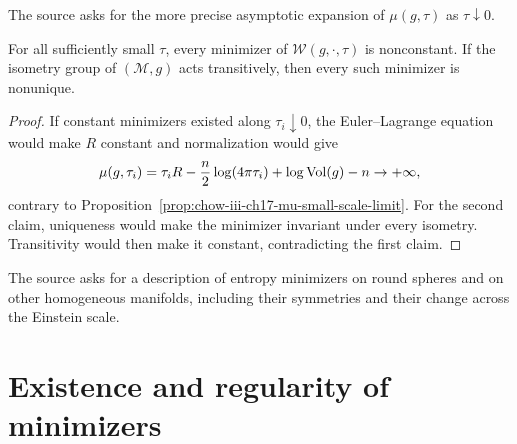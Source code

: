 \begin{remark}
\label{rem:chow-iii-ch17-mu-small-scale-asymptotics-problem}

The source asks for the more precise asymptotic expansion of $\mu(g,\tau)$
as $\tau\downarrow0$.
\end{remark}

\begin{lemma}
\label{lem:chow-iii-ch17-small-minimizer-nonconstant-nonunique}


For all sufficiently small $\tau$, every minimizer of
$\mathcal W(g,\cdot,\tau)$ is nonconstant.  If the isometry group of
$(\mathcal M,g)$ acts transitively, then every such minimizer is nonunique.
\end{lemma}
\begin{proof}
\sketch If constant minimizers existed along $\tau_i\downarrow0$, the
Euler--Lagrange equation would make $R$ constant and normalization would give
\[
 \mu(g,\tau_i)=\tau_iR-\frac n2\log(4\pi\tau_i)+\log\operatorname{Vol}(g)-n\to+\infty,
\]
contrary to Proposition~\ref{prop:chow-iii-ch17-mu-small-scale-limit}.
For the second claim, uniqueness would make the minimizer invariant under
every isometry.  Transitivity would then make it constant, contradicting the
first claim.
\end{proof}

\begin{remark}
\label{rem:chow-iii-ch17-homogeneous-minimizer-problem}

The source asks for a description of entropy minimizers on round spheres and
on other homogeneous manifolds, including their symmetries and their change
across the Einstein scale.
\end{remark}

\section{Existence and regularity of minimizers}

